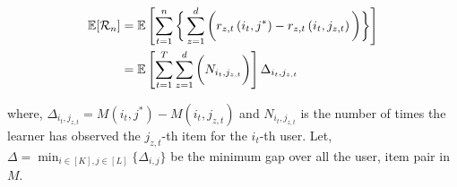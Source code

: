 \begin{align*}
\mathbb{E}[\mathcal{R}_n] & = \mathbb{E}\left [ \sum_{t=1}^{n}\bigg\lbrace\sum_{z=1}^{d} \bigg( r_{z,t}\left(i_t, j^* \right) - r_{z, t}\left( i_t, j_{z, t}\right)\bigg)\bigg\rbrace\right] \\
&= \mathbb{E}\left [ \sum_{t=1}^{T} \sum_{z=1}^{d} \bigg( N_{i_t,j_{z,t}}\bigg) \right ]\Delta_{i_t,j_{z,t}}
\end{align*}

where, $\Delta_{i_t,j_{z,t}} = M(i_t,j^*) - M(i_t,j_{z,t})$ and $N_{i_t,j_{z,t}}$ is the number of times the learner has observed the $j_{z,t}$-th item for the $i_t$-th user. Let, $\Delta = \min_{i\in[K],j\in[L]}\lbrace \Delta_{i,j}\rbrace$ be the minimum gap over all the user, item pair in $M$.
